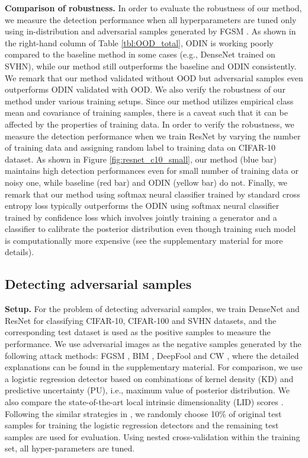 \documentclass{article}
\begin{document}
{\bf Comparison of robustness.}
In order to evaluate the robustness of our method,
we measure the detection performance when all hyperparameters are tuned only using in-distribution and adversarial samples generated by FGSM \citep{goodfellow2014explaining}.
As shown in the right-hand column of Table \ref{tbl:OOD_total},
ODIN is working poorly compared to the baseline method in some cases (e.g., DenseNet trained on SVHN), while our method still outperforms the baseline and ODIN consistently.
We remark that our method validated without OOD but adversarial samples even outperforms ODIN validated with OOD.
We also verify the robustness of our method under various training setups. Since our method utilizes empirical class mean and covariance of training samples, there is a caveat such that it can be affected by the properties of training data. 
In order to verify the robustness,
we measure the detection performance when we train ResNet by varying the number of training data and assigning random label to training data on CIFAR-10 dataset.
As shown in Figure \ref{fig:resnet_c10_small}, 
our method (blue bar) maintains high detection performances even for small number of training data or noisy one, while baseline (red bar) and ODIN (yellow bar) do not.
Finally, we remark that our method using softmax neural classifier trained by standard cross entropy loss typically outperforms the ODIN using softmax neural classifier trained by confidence loss \citep{lee2017training} which involves jointly training a generator and a classifier to calibrate the posterior distribution even though training such model is computationally more expensive (see the supplementary material for more details).


\subsection{Detecting adversarial samples} \label{sec:exp_adv}


{\bf Setup.} For the problem of detecting adversarial samples, 
we train DenseNet and ResNet for classifying CIFAR-10, CIFAR-100 and SVHN datasets, 
and the corresponding test dataset is used as the positive samples to measure the performance.
We use adversarial images as the negative samples generated by the following attack methods: 
FGSM \citep{goodfellow2014explaining}, BIM \citep{kurakin2016adversarial}, DeepFool \citep{moosavi2016deepfool} and CW \citep{carlini2017adversarial}, where the detailed explanations can be found in the supplementary material.
For comparison, 
we use a logistic regression detector based on combinations of kernel density (KD) \citep{feinman2017detecting} and predictive uncertainty (PU), i.e., maximum value of posterior distribution.
We also compare the state-of-the-art local intrinsic dimensionality (LID) scores \citep{ma2018characterizing}.
Following the similar strategies in \citep{feinman2017detecting, ma2018characterizing},
we randomly choose 10\% of original test samples for training the logistic regression detectors and the remaining test samples are used for evaluation.
Using nested cross-validation within the training set, all hyper-parameters are tuned.
\end{document}
